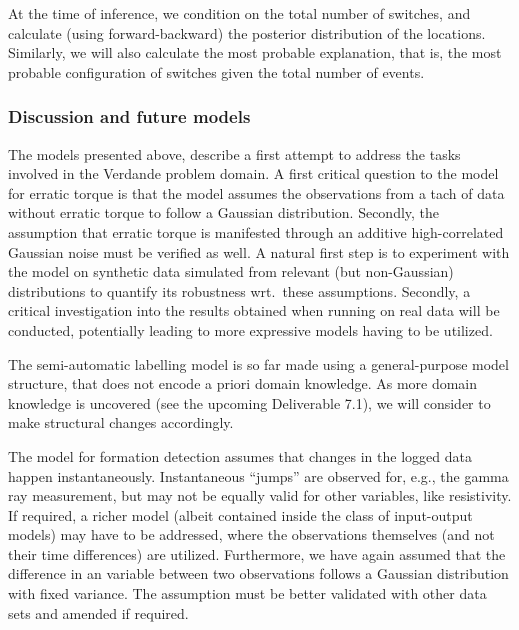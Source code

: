 At the time of inference, we condition on the total number of switches, and calculate (using forward-backward) the posterior distribution of the locations. Similarly, we will also calculate the most probable explanation, that is, the most probable configuration of switches given the total number of events.

\subsubsection{Discussion and future models}

The models presented above, describe a first attempt to address the tasks involved in the Verdande problem domain. A first critical question to the model for erratic torque is that the model assumes the observations from a tach of data without erratic torque to follow a Gaussian distribution. Secondly, the assumption that erratic torque is manifested through an additive high-correlated Gaussian noise must be verified as well. A natural first step is to experiment with the model on synthetic data simulated from relevant (but non-Gaussian) distributions to quantify its robustness wrt.\ these assumptions. Secondly, a critical investigation into the results obtained when running on real data will be conducted, potentially leading to  more expressive models having to be utilized. 


The semi-automatic labelling model is so far made using a general-purpose model structure, that does not encode a priori domain knowledge. As more domain knowledge is uncovered (see the upcoming Deliverable 7.1), we will consider to make structural changes accordingly. 


The model for formation detection assumes that changes in the logged data happen instantaneously. Instantaneous ``jumps'' are observed for, e.g., the gamma ray measurement, but may not be equally valid for other variables, like resistivity. If required, a richer model (albeit contained inside the class of input-output models) may have to be addressed, where the observations themselves (and not their time differences) are utilized. Furthermore, we have again  assumed that the difference in an variable between two observations follows a Gaussian distribution with fixed variance. The assumption must be better validated with other data sets and amended if required.





